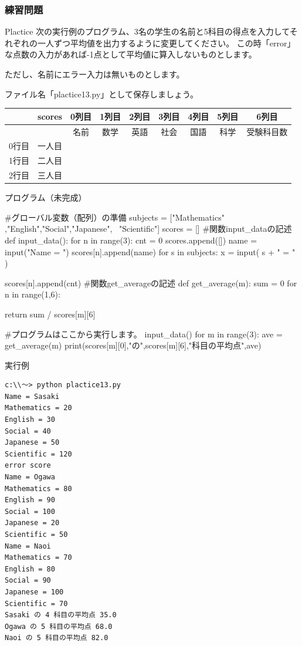 \documentclass[11pt,a4paper,dvipdfmx,titlepage]{jsreport}
\begin{document}
\subsubsection{練習問題}
\begin{plabox}{Plactice}
次の実行例のプログラム、3名の学生の名前と5科目の得点を入力してそれぞれの一人ずつ平均値を出力するように変更してください。
この時「error」な点数の入力があれば-1点として平均値に算入しないものとします。

ただし、名前にエラー入力は無いものとします。

ファイル名「plactice13.py」として保存しましょう。
\begin{center}
\begin{tabular}{|c|c|c|c|c|c|c|c|c|} \hline
       &scores&0列目&1列目&2列目&3列目&4列目&5列目&6列目 \\ \hline \hline
       & &名前&数学&英語&社会&国語&科学&受験科目数\\ \hline 
0行目  & 一人目& & & & & & &\\ \hline
1行目  & 二人目& & & & & & &\\ \hline
2行目  & 三人目& & & & & & &\\ \hline
\end{tabular}
\end{center}

\begin{codebox}{プログラム（未完成）}
\begin{listing}{1}
#グローバル変数（配列）の準備
subjects = ["Mathematics" ,"English","Social","Japanese", \
			"Scientific"]
scores = []
#関数input_dataの記述
def input_data():
    for n in range(3):
        cnt = 0
        scores.append([])
        name = input("Name = ")
        scores[n].append(name)
        for s in subjects:
            x = input( s + " = " )
            
            
            
            
            
            
            
        scores[n].append(cnt)
#関数get_averageの記述
def get_average(m):
    sum = 0
    for n in range(1,6):
        
        
    return sum / scores[m][6]

#プログラムはここから実行します。
input_data()
for m in range(3):
    ave = get_average(m)
    print(scores[m][0],"の",scores[m][6],"科目の平均点",ave)
\end{listing}
\end{codebox}
\begin{codebox}{実行例}
\begin{verbatim}
c:\\～> python plactice13.py
Name = Sasaki
Mathematics = 20
English = 30
Social = 40
Japanese = 50
Scientific = 120
error score
Name = Ogawa
Mathematics = 80
English = 90
Social = 100
Japanese = 20
Scientific = 50
Name = Naoi
Mathematics = 70
English = 80
Social = 90
Japanese = 100
Scientific = 70
Sasaki の 4 科目の平均点 35.0
Ogawa の 5 科目の平均点 68.0
Naoi の 5 科目の平均点 82.0
\end{verbatim}
\end{codebox}
\end{plabox}
\end{document}
